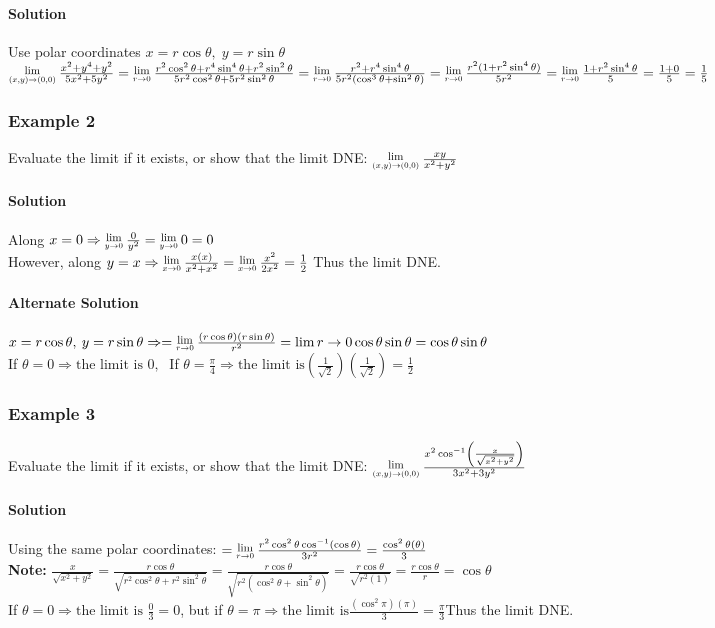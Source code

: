 \documentclass{article}
\newcommand{\Lim}[1]{\raisebox{0.5ex}{\scalebox{0.8}{$\displaystyle \lim_{#1}\;$}}}
\begin{document}
\paragraph{Solution} Use polar coordinates $x=r\cos\theta,\;y=r\sin\theta$
\\$\Lim{(x,y)\to(0,0)}\frac{x^2+y^4+y^2}{5x^2+5y^2}=\Lim{r\to0}\frac{r^2\cos^2\theta+r^4\sin^4\theta+r^2\sin^2\theta}{5r^2\cos^2\theta+5r^2\sin^2\theta}
=\Lim{r\to0}\frac{r^2+r^4\sin^4\theta}{5r^2(\cos^3\theta+\sin^2\theta)}=\Lim{r\to0}\frac{r^2(1+r^2\sin^4\theta)}{5r^2}
=\Lim{r\to0}\frac{1+r^2\sin^4\theta}{5}
\\=\frac{1+0}{5}=\frac{1}{5}$

\subsubsection{Example 2}
Evaluate the limit if it exists, or show that the limit DNE: $\Lim{(x,y)\to(0,0)}\frac{xy}{x^2+y^2}$
\paragraph{Solution} Along $x=0\Rightarrow\Lim{y\to0}\frac{0}{y^2}=\Lim{y\to0}0=0$
\\However, along $y=x\Rightarrow\Lim{x\to0}\frac{x(x)}{x^2+x^2}=\Lim{x\to0}\frac{x^2}{2x^2}=\frac{1}{2}$
\qquad Thus the limit DNE.
\paragraph{Alternate Solution} $x=r\cos\theta,\:y=r\sin\theta\Rightarrow=\Lim{r\to0}\frac{(r\cos\theta)(r\sin\theta)}{r^2}=\lim{r\to0}\cos\theta\sin\theta=\cos\theta\sin\theta$
\\If $\theta=0\Rightarrow\text{the limit is }0,\;$ If $\theta=\frac{\pi}{4}\Rightarrow\text{the limit is}\left(\frac{1}{\sqrt{2}}\right)\left(\frac{1}{\sqrt{2}}\right)=\frac{1}{2}$

\subsubsection{Example 3}
Evaluate the limit if it exists, or show that the limit DNE: $\Lim{(x,y)\to(0,0)}\frac{x^2\cos^{-1}\left(\frac{x}{\sqrt{x^2+y^2}}\right)}{3x^2+3y^2}$
\paragraph{Solution} Using the same polar coordinates: $=\Lim{r\to0}\frac{r^2\cos^2\theta\cos^{-1}\left(\cos\theta\right)}{3r^2}=\frac{\cos^2\theta(\theta)}{3}$
\\\textbf{Note:} $\frac{x}{\sqrt{x^2+y^2}}=\frac{r\cos\theta}{\sqrt{r^2\cos^2\theta+r^2\sin^2\theta}}=\frac{r\cos\theta}{\sqrt{r^2(\cos^2\theta+\sin^2\theta)}}=\frac{r\cos\theta}{\sqrt{r^2(1)}}=\frac{r\cos\theta}{r}=\cos\theta$
\\If $\theta=0\Rightarrow\text{the limit is }\frac{0}{3}=0$, but if $\theta=\pi\Rightarrow\text{the limit is}\frac{(\cos^2\pi)(\pi)}{3}=\frac{\pi}{3}$\qquad Thus the limit DNE.
\end{document}
